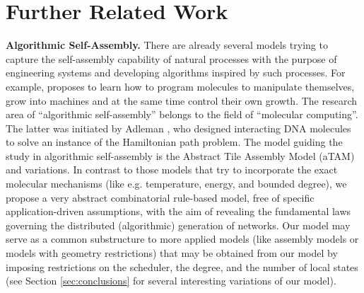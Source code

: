 \documentclass[oribibl, 11pt]{llncs}
\begin{document}
\section{Further Related Work}
\label{sec:rw}

\noindent\textbf{Algorithmic Self-Assembly.} There are already several models trying to capture the self-assembly capability of natural processes with the purpose of engineering systems and developing algorithms inspired by such processes. For example, \cite{Do12} proposes to learn how to program molecules to manipulate themselves, grow into machines and at the same time control their own growth. The research area of ``algorithmic self-assembly'' belongs to the field of ``molecular computing''. The latter was initiated by Adleman \cite{Ad94}, who designed interacting DNA molecules to solve an instance of the Hamiltonian path problem. The model guiding the study in algorithmic self-assembly is the Abstract Tile Assembly Model (aTAM) \cite{Wi98,RW00} and variations. In contrast to those models that try to incorporate the exact molecular mechanisms (like e.g. temperature, energy, and bounded degree), we propose a very abstract combinatorial rule-based model, free of specific application-driven assumptions, with the aim of revealing the fundamental laws governing the distributed (algorithmic) generation of networks. Our model may serve as a common substructure to more applied models (like assembly models or models with geometry restrictions) that may be obtained from our model by imposing restrictions on the scheduler, the degree, and the number of local states (see Section \ref{sec:conclusions} for several interesting variations of our model).\\
\end{document}
